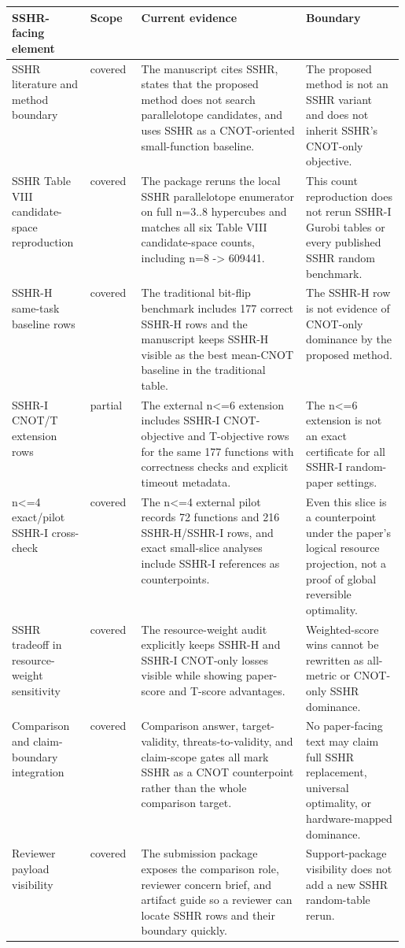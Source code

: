 \begin{tabularx}{\linewidth}{>{\raggedright\arraybackslash}p{0.20\linewidth}>{\raggedright\arraybackslash}p{0.13\linewidth}>{\raggedright\arraybackslash}X>{\raggedright\arraybackslash}p{0.25\linewidth}}
\toprule
SSHR-facing element & Scope & Current evidence & Boundary \\
\midrule
SSHR literature and method boundary & covered & The manuscript cites SSHR, states that the proposed method does not search parallelotope candidates, and uses SSHR as a CNOT-oriented small-function baseline. & The proposed method is not an SSHR variant and does not inherit SSHR's CNOT-only objective. \\
SSHR Table VIII candidate-space reproduction & covered & The package reruns the local SSHR parallelotope enumerator on full n=3..8 hypercubes and matches all six Table VIII candidate-space counts, including n=8 -> 609441. & This count reproduction does not rerun SSHR-I Gurobi tables or every published SSHR random benchmark. \\
SSHR-H same-task baseline rows & covered & The traditional bit-flip benchmark includes 177 correct SSHR-H rows and the manuscript keeps SSHR-H visible as the best mean-CNOT baseline in the traditional table. & The SSHR-H row is not evidence of CNOT-only dominance by the proposed method. \\
SSHR-I CNOT/T extension rows & partial & The external n<=6 extension includes SSHR-I CNOT-objective and T-objective rows for the same 177 functions with correctness checks and explicit timeout metadata. & The n<=6 extension is not an exact certificate for all SSHR-I random-paper settings. \\
n<=4 exact/pilot SSHR-I cross-check & covered & The n<=4 external pilot records 72 functions and 216 SSHR-H/SSHR-I rows, and exact small-slice analyses include SSHR-I references as counterpoints. & Even this slice is a counterpoint under the paper's logical resource projection, not a proof of global reversible optimality. \\
SSHR tradeoff in resource-weight sensitivity & covered & The resource-weight audit explicitly keeps SSHR-H and SSHR-I CNOT-only losses visible while showing paper-score and T-score advantages. & Weighted-score wins cannot be rewritten as all-metric or CNOT-only SSHR dominance. \\
Comparison and claim-boundary integration & covered & Comparison answer, target-validity, threats-to-validity, and claim-scope gates all mark SSHR as a CNOT counterpoint rather than the whole comparison target. & No paper-facing text may claim full SSHR replacement, universal optimality, or hardware-mapped dominance. \\
Reviewer payload visibility & covered & The submission package exposes the comparison role, reviewer concern brief, and artifact guide so a reviewer can locate SSHR rows and their boundary quickly. & Support-package visibility does not add a new SSHR random-table rerun. \\
\bottomrule
\end{tabularx}
